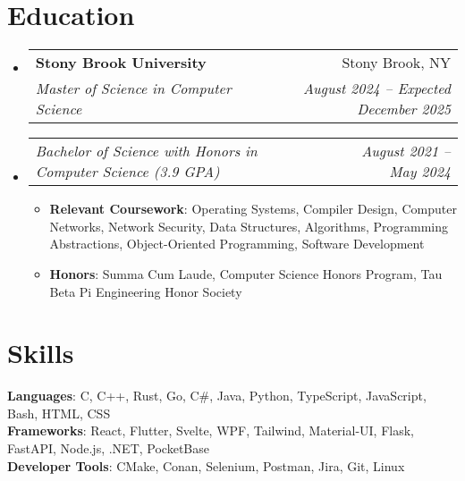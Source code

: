 \documentclass[letterpaper,11pt]{article}
\makeatletter
\newcommand{\resumeItem}[1]{
  \item\small{
    {#1 \vspace{-2pt}}
  }
}
\newcommand{\resumeSubheading}[4]{
  \vspace{-2pt}\item
    \begin{tabular*}{0.97\textwidth}[t]{l@{\extracolsep{\fill}}r}
      \textbf{#1} & #2 \\
      \textit{\small#3} & \textit{\small #4} \\
    \end{tabular*}\vspace{-7pt}
}
\newcommand{\resumeSubSubheading}[2]{
    \item
    \begin{tabular*}{0.97\textwidth}{l@{\extracolsep{\fill}}r}
      \textit{\small#1} & \textit{\small #2} \\
    \end{tabular*}\vspace{-7pt}
}
\newcommand{\resumeSubHeadingListStart}{\begin{itemize}[leftmargin=0.15in, label={}]}
\newcommand{\resumeSubHeadingListEnd}{\end{itemize}}
\newcommand{\resumeItemListStart}{\begin{itemize}}
\newcommand{\resumeItemListEnd}{\end{itemize}\vspace{-5pt}}
\makeatother
\begin{document}
\section{Education}
  \resumeSubHeadingListStart
    \resumeSubheading
    {Stony Brook University}{Stony Brook, NY}
    {Master of Science in Computer Science}{August 2024 -- Expected December 2025}
    \resumeSubSubheading
    {Bachelor of Science with Honors in Computer Science (3.9 GPA)}{August 2021 -- May 2024}
    \resumeItemListStart
        \resumeItem{\textbf{Relevant Coursework}: Operating Systems, Compiler Design, Computer Networks, Network Security, Data Structures, Algorithms, Programming Abstractions, Object-Oriented Programming, Software Development}
        \resumeItem{\textbf{Honors}: Summa Cum Laude, Computer Science Honors Program, Tau Beta Pi Engineering Honor Society}
    \resumeItemListEnd
  \resumeSubHeadingListEnd

\section{Skills}
\begin{itemize}[leftmargin=0.15in, label={}]
    \small{\item{
     \textbf{Languages}{: C, C++, Rust, Go, C\#, Java, Python, TypeScript, JavaScript, Bash, HTML, CSS} \\
     \textbf{Frameworks}{: React, Flutter, Svelte, WPF, Tailwind, Material-UI, Flask, FastAPI, Node.js, .NET, PocketBase} \\
     \textbf{Developer Tools}{: CMake, Conan, Selenium, Postman, Jira, Git, Linux}
    }}
 \end{itemize}

\end{document}

